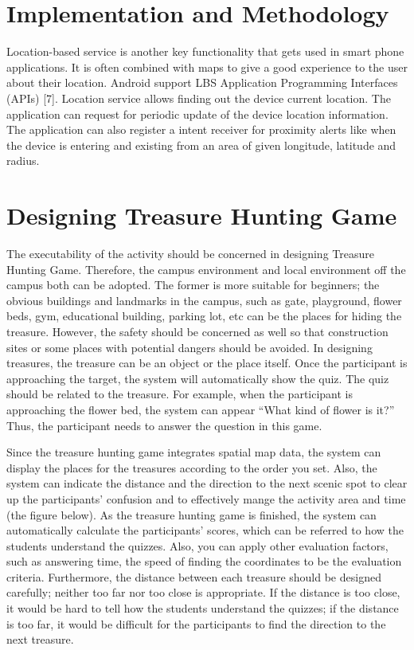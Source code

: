 \documentclass[12pt,a4paper,times]{report}
\begin{document}
	\section{Implementation and Methodology}
	
	Location-based service is another key functionality that 
	gets used in smart phone applications. It is often combined 
	with maps to give a good experience to the user about their 
	location. 
	Android support LBS Application Programming Interfaces 
	(APIs) [7]. Location service allows finding out the device 
	current location. The application can request for periodic 
	update of the device location information. The application 
	can also register a intent receiver for proximity alerts like 
	when the device is entering and existing from an area of 
	given longitude, latitude and radius.
	
	

	
	

	\section{Designing Treasure Hunting Game}
	
	The executability of the activity should be concerned in designing Treasure Hunting Game. Therefore, the campus environment and local environment off the campus both can be adopted. The former is more suitable for beginners; the obvious buildings and landmarks in the campus, such as gate, playground, flower beds, gym, educational building, parking lot, etc can be the places for hiding the treasure. However, the safety should be concerned as well so that construction sites or some places with potential dangers should be avoided. In designing treasures, the treasure can be an object or the place itself. Once the participant is approaching the target, the system will automatically show the quiz. The quiz should be related to the treasure. For example, when the participant is approaching the flower bed, the system can appear “What kind of flower is it?” Thus, the participant needs to answer the question in this game. 
	
	Since the treasure hunting game integrates spatial map data, the system can display the places for the treasures according to the order you set. Also, the system can indicate the distance and the direction to the next scenic spot to clear up the participants’ confusion and to effectively mange the activity area and time (the figure below). As the treasure hunting game is finished, the system can automatically calculate the participants’ scores, which can be referred to how the students understand the quizzes. Also, you can apply other evaluation factors, such as answering time, the speed of finding the coordinates to be the evaluation criteria. Furthermore, the distance between each treasure should be designed carefully; neither too far nor too close is appropriate. If the distance is too close, it would be hard to tell how the students understand the quizzes; if the distance is too far, it would be difficult for the participants to find the direction to the next treasure.
	
\end{document}
